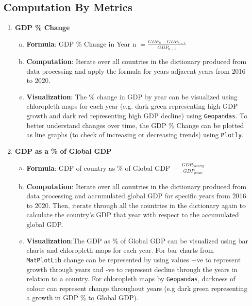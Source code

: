 \documentclass[fontsize=11pt]{article}
\begin{document}
    \subsection*{Computation By Metrics}
    \begin{enumerate}
        \item \textbf{GDP \% Change}
            \begin{enumerate}[(a)]
                \item \textbf{Formula}: GDP \% Change in Year n $= \frac{GDP_{n}-GDP_{n-1}}{GDP_{n-1}}$
                \item \textbf{Computation}: Iterate over all countries in the dictionary produced from data processing and apply the formula for years adjacent years from 2016 to 2020.
                \item \textbf{Visualization}: The \% change in GDP by year can be visualized using chloropleth maps for each year (e.g. dark green representing high GDP growth and dark red representing high GDP decline) using \texttt{Geopandas}. To better understand changes over time, the GDP \% Change can be plotted as line graphs (to check of increasing or decreasing trends) using \texttt{Plotly}.
            \end{enumerate}

        \item \textbf{GDP as a \% of Global GDP}
            \begin{enumerate}[(a)]
                \item \textbf{Formula}: GDP of country as \% of Global GDP $= \frac{GDP_{country}}{GDP_{global}}$
                \item \textbf{Computation}: Iterate over all countries in the dictionary produced from data processing and accumulated global GDP for specific years from 2016 to 2020. Then, iterate through all the countries in the dictionary again to calculate the country's GDP that year with respect to the accumulated global GDP.
                \item \textbf{Visualization}:The GDP as \% of Global GDP can be visualized using bar charts and chloropleth maps for each year. For bar charts from \texttt{MatPlotLib} change can be represented by using values +ve to represent growth through years and -ve to represent decline through the years in relation to a country. For chloropleth maps by \texttt{Geopandas}, darkness of colour can represent change throughout years (e.g dark green representing a growth in GDP \% to Global GDP).
            \end{enumerate}


\end{enumerate}
\end{document}
